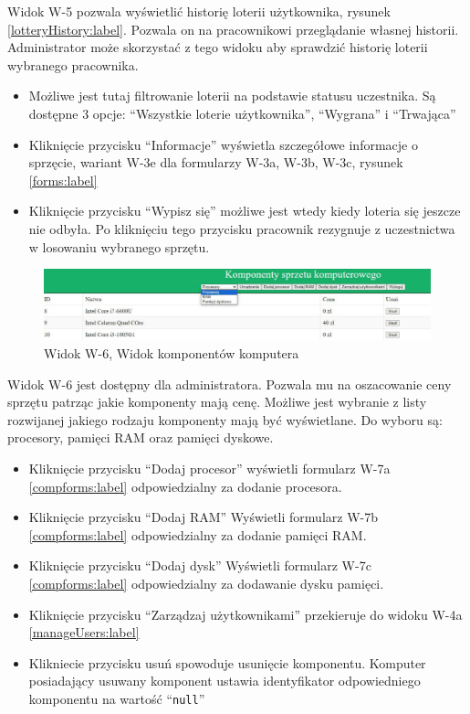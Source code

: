 Widok W-5 pozwala wyświetlić historię loterii użytkownika, rysunek \ref{lotteryHistory:label}. Pozwala on na pracownikowi przeglądanie własnej historii. Administrator może skorzystać z tego widoku aby sprawdzić historię loterii wybranego pracownika.
\begin {itemize}
	\item Możliwe jest tutaj filtrowanie loterii na podstawie statusu uczestnika. Są dostępne 3 opcje: "`Wszystkie loterie użytkownika"', "`Wygrana"' i "`Trwająca"'
	\item Kliknięcie przycisku "`Informacje"' wyświetla szczegółowe informacje o sprzęcie, wariant \mbox{W-3e} dla formularzy W-3a, W-3b, W-3c, rysunek \ref{forms:label} 
	\item Kliknięcie przycisku "`Wypisz się"' możliwe jest wtedy kiedy loteria się jeszcze nie odbyła. Po kliknięciu tego przycisku pracownik rezygnuje z uczestnictwa w losowaniu wybranego sprzętu.
\end{itemize} 




\begin{figure}[h]
		\centering
    \includegraphics[width=\linewidth]{rys05/view/components.pdf}
    \caption{Widok W-6, Widok komponentów komputera}
    \label{components:label}
\end{figure}

Widok W-6 jest dostępny dla administratora. Pozwala mu na oszacowanie ceny sprzętu patrząc jakie komponenty mają cenę. Możliwe jest wybranie z listy rozwijanej jakiego rodzaju komponenty mają być wyświetlane. Do wyboru są: procesory, pamięci RAM oraz pamięci dyskowe.
\begin{itemize}
	\item Kliknięcie przycisku "`Dodaj procesor"' wyświetli formularz W-7a \ref{compforms:label} odpowiedzialny za dodanie procesora.
	\item Kliknięcie przycisku "`Dodaj RAM"' Wyświetli formularz W-7b \ref{compforms:label} odpowiedzialny za dodanie pamięci RAM.
	\item Kliknięcie przycisku "`Dodaj dysk"' Wyświetli formularz W-7c \ref{compforms:label} odpowiedzialny za dodawanie dysku pamięci.
	\item Kliknięcie przycisku "`Zarządzaj użytkownikami"' przekieruje do widoku W-4a \ref{manageUsers:label}
	\item Klikniecie przycisku usuń spowoduje usunięcie komponentu. Komputer posiadający usuwany komponent ustawia identyfikator odpowiedniego komponentu na wartość "`\texttt{null}"'
\end{itemize} 

